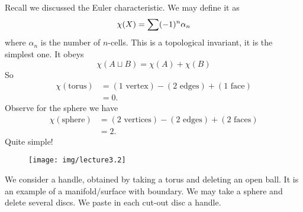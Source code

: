 Recall we discussed the Euler characteristic.
We may define it as
\begin{equation}\index{$\chi(X)$}
\chi(X)=\sum(-1)^{n}\alpha_{n}
\end{equation}
where $\alpha_{n}$ is the number of $n$-cells. This is a
topological invariant, it is the simplest one. It obeys
\begin{equation}
\chi(A\sqcup B)=\chi(A)+\chi(B)
\end{equation}
So
\begin{equation}
\begin{split}
\chi(\mbox{torus}) &= (\mbox{1 vertex})-(\mbox{2 edges})+(\mbox{1 face})\\
&=0.
\end{split}
\end{equation}
Observe for the sphere we have
\begin{equation}
\begin{split}
\chi(\mbox{sphere}) &= (\mbox{2 vertices})-(\mbox{2
edges})+(\mbox{2 faces})\\
&=2.
\end{split}
\end{equation}
Quite simple!

\begin{wrapfigure}{r}{1.68in}
  \vspace{-36pt}
  \texttt{[image: img/lecture3.2]}
  \vspace{-36pt}
\end{wrapfigure}
We consider a handle, obtained by taking a torus and deleting an
open ball. It is an example of a manifold/surface with
boundary. We may take a sphere and delete several discs. We paste
in each cut-out disc a handle.
